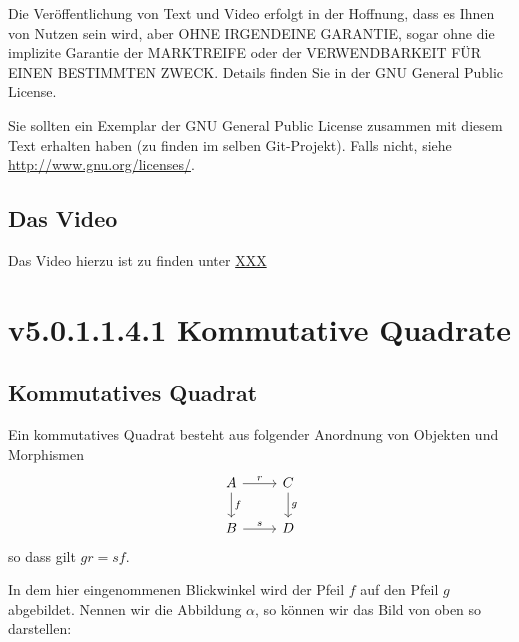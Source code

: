 \documentclass[a4paper]{amsart}
\theoremstyle{definition}
\begin{document}
Die Veröffentlichung von Text und Video erfolgt in der Hoffnung, dass es Ihnen von Nutzen sein wird,
aber OHNE IRGENDEINE GARANTIE, sogar ohne die implizite Garantie der MARKTREIFE oder der
VERWENDBARKEIT FÜR EINEN BESTIMMTEN ZWECK. Details finden Sie in der GNU General Public License.

Sie sollten ein Exemplar der GNU General Public License zusammen mit diesem Text erhalten haben
(zu finden im selben Git-Projekt).
Falls nicht, siehe \url{http://www.gnu.org/licenses/}.

\subsection*{Das Video}
Das Video hierzu ist zu finden unter
{\tiny
   \url{XXX}
}

\section{v5.0.1.1.4.1 Kommutative Quadrate}

\subsection{Kommutatives Quadrat }
Ein kommutatives Quadrat besteht aus folgender Anordnung von Objekten und Morphismen
\begin{equation}
    \begin{tikzcd}
        A   \arrow[d, "f"]  \arrow[r, "r"] & C \arrow[d, "g"]\\
        B                   \arrow[r, "s"] & D
    \end{tikzcd}
\end{equation}
so dass gilt $gr = sf$.

In dem hier eingenommenen Blickwinkel wird der Pfeil $f$ auf den Pfeil $g$ abgebildet. Nennen wir die Abbildung $\alpha$, so können wir das Bild von oben so darstellen:
\end{document}
